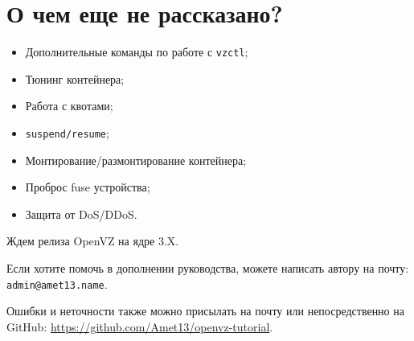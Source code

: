 \section{О чем еще не рассказано?}

\begin{itemize}
    \item Дополнительные команды по работе с \texttt{vzctl};
    \item Тюнинг контейнера;
    \item Работа с квотами;
    \item \texttt{suspend/resume};
    \item Монтирование/размонтирование контейнера;
    \item Проброс fuse устройства;
    \item Защита от DoS/DDoS.
\end{itemize}

Ждем релиза OpenVZ на ядре 3.X.

Если хотите помочь в дополнении руководства, можете написать автору на почту: \texttt{admin@amet13.name}.

Ошибки и неточности также можно присылать на почту или непосредственно на GitHub: \url{https://github.com/Amet13/openvz-tutorial}.

\clearpage
